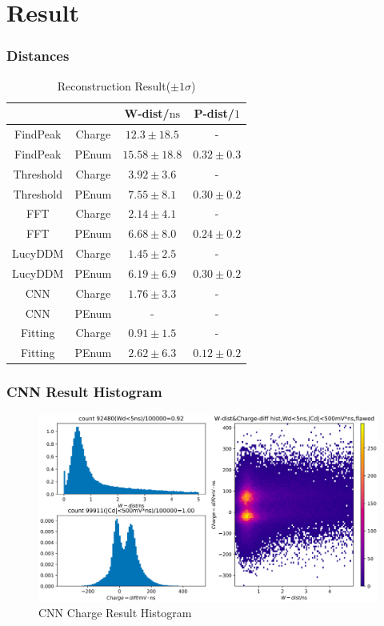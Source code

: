 \documentclass{beamer}
\begin{document}
\section{Result}
\begin{frame}
\frametitle{Distances}
\setlength{\belowcaptionskip}{0mm}
\begin{table}
    \centering
    \caption{Reconstruction Result($\pm1\sigma$)}
    \begin{tabular}{c|c|c|c}
        \hline
        &  & W-dist/$\mathrm{ns}$ & P-dist/$\mathrm{1}$ \\
        \hline
        FindPeak & Charge & $12.3\pm18.5$ & - \\
        \hline
        FindPeak & PEnum & $15.58\pm18.8$ & $0.32\pm0.3$ \\
        \hline
        Threshold & Charge & $3.92\pm3.6$ & - \\
        \hline
        Threshold & PEnum & $7.55\pm8.1$ & $0.30\pm0.2$ \\
        \hline
        FFT & Charge & $2.14\pm4.1$ & - \\
        \hline
        FFT & PEnum & $6.68\pm8.0$ & $0.24\pm0.2$ \\
        \hline
        LucyDDM & Charge & $1.45\pm2.5$ & - \\
        \hline
        LucyDDM & PEnum & $6.19\pm6.9$ & $0.30\pm0.2$ \\
        \hline
        CNN & Charge & $1.76\pm3.3$ & - \\
        \hline
        CNN & PEnum & - & - \\
        \hline
        Fitting & Charge & $0.91\pm1.5$ & - \\
        \hline
        Fitting & PEnum & $2.62\pm6.3$ & $0.12\pm0.2$ \\
        \hline
    \end{tabular}
\end{table}
\end{frame}

\begin{frame}
\frametitle{CNN Result Histogram}
\begin{figure}
    \centering
    \caption{CNN Charge Result Histogram}
    \includegraphics[width=1.0\linewidth]{img/takarahist.png}
\end{figure}
\end{frame}
\end{document}
